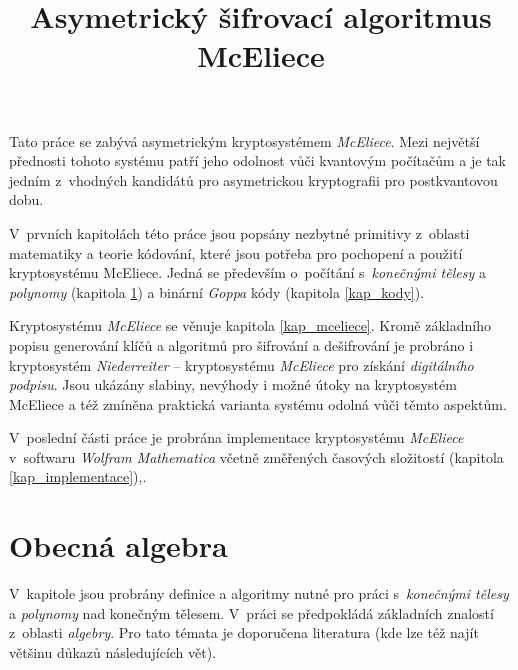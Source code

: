 \documentclass[thesis=M,czech,hidelinks]{FITthesis}[2012/06/26]
\title{Asymetrický šifrovací algoritmus McEliece}
\newcommand{\0}{{\textcolor[gray]{0.80}{0}}}
\begin{document}

\begin{introduction}
Tato práce se zabývá asymetrickým kryptosystémem \emph{McEliece}. Mezi největší
přednosti tohoto systému patří jeho odolnost vůči kvantovým počítačům a je tak
jedním z~vhodných kandidátů pro asymetrickou kryptografii pro postkvantovou
dobu.

V~prvních kapitolách této práce jsou popsány nezbytné primitivy z~oblasti
matematiky a teorie kódování, které jsou potřeba pro pochopení a použití
kryptosystému McEliece. Jedná se především o~počítání s~\emph{konečnými tělesy}
a \emph{polynomy} (kapitola \ref{kap_telesa}) a binární \emph{Goppa} kódy
(kapitola \ref{kap_kody}).

Kryptosystému \emph{McEliece} se věnuje kapitola \ref{kap_mceliece}. Kromě
základního popisu generování klíčů a algoritmů pro šifrování a dešifrování je
probráno i kryptosystém \emph{Niederreiter} --  kryptosystému
\emph{McEliece} pro získání \emph{digitálního podpisu}. Jsou ukázány slabiny,
nevýhody i možné útoky na kryptosystém McEliece a též zmíněna praktická varianta
systému odolná vůči těmto aspektům.

V~poslední části  práce je probrána implementace kryptosystému \emph{McEliece}
v~softwaru \emph{Wolfram Mathematica} včetně změřených časových
složitostí (kapitola \ref{kap_implementace}),.

\end{introduction}


\chapter{Obecná algebra}\label{kap_telesa}
V~kapitole jsou probrány definice a algoritmy nutné pro práci s~\emph{konečnými
tělesy} a \emph{polynomy} nad konečným tělesem. V~práci se předpokládá
základních znalostí z~oblasti \emph{algebry}. Pro tato témata je doporučena
literatura \cite{FIT_MPI,FIT_MKY,FIT_LIN,FIT_BHW,Paar} (kde lze též
najít většinu důkazů následujících vět).
\end{document}
